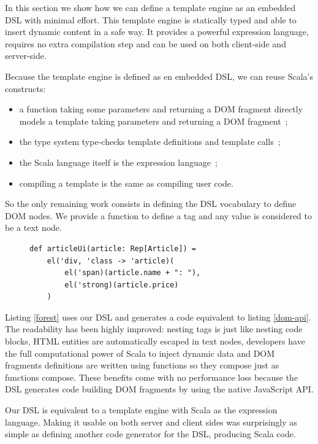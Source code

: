\documentclass[preprint]{sigplanconf}
\begin{document}
In this section we show how we can define a template engine as an embedded DSL with minimal effort. This template
engine is statically typed and able to insert dynamic content in a safe way. It provides a powerful expression
language, requires no extra compilation step and can be used on both client-side and server-side.

Because the template engine is defined as en embedded DSL, we can reuse Scala’s constructs:

\begin{itemize}
\item a function taking some parameters and returning a DOM fragment directly models a template taking parameters and
returning a DOM fragment~;
\item the type system type-checks template definitions and template calls~;
\item the Scala language itself is the expression language~;
\item compiling a template is the same as compiling user code.
\end{itemize}

So the only remaining work consists in defining the DSL vocabulary to define DOM nodes. We provide a 
function to define a tag and any  value is considered to be a text node.

\begin{figure}
\begin{lstlisting}[label=forest,caption=DOM definition DSL]
def articleUi(article: Rep[Article]) =
    el('div, 'class -> 'article)(
        el('span)(article.name + ": "),
        el('strong)(article.price)
    )
\end{lstlisting}
\end{figure}

Listing \ref{forest} uses our DSL and generates a code equivalent to listing \ref{dom-api}. The readability has
been highly improved: nesting tags is just like nesting code blocks, HTML entities are
automatically escaped in text nodes, developers have the full computational power of Scala to inject dynamic data and
DOM fragments definitions are written using functions so they compose just as functions compose. These benefits come
with no performance loss because the DSL generates code building DOM fragments by using the native JavaScript API.

Our DSL is equivalent to a template engine with Scala as the expression language. Making it usable on both server and
client sides was surprisingly as simple as defining another code generator for the DSL, producing Scala code.
\end{document}
